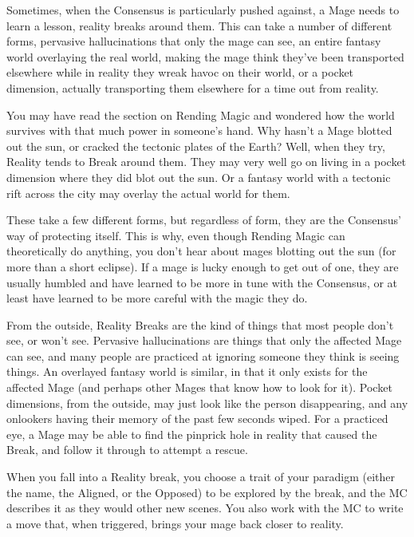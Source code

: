 \documentclass[
  oneside,
  statementpaper,
  9pt]{memoir}
\begin{document}
\begin{Player}

Sometimes, when the Consensus is particularly pushed against, a Mage needs to learn a lesson, reality breaks around them. This can take a number of different forms, pervasive hallucinations that only the mage can see, an entire fantasy world overlaying the real world, making the mage think they’ve been transported elsewhere while in reality they wreak havoc on their world, or a pocket dimension, actually transporting them elsewhere for a time out from reality.

You may have read the section on Rending Magic and wondered how the world survives with that much power in someone’s hand. Why hasn’t a Mage blotted out the sun, or cracked the tectonic plates of the Earth? Well, when they try, Reality tends to Break around them. They may very well go on living in a pocket dimension where they did blot out the sun. Or a fantasy world with a tectonic rift across the city may overlay the actual world for them.

These take a few different forms, but regardless of form, they are the Consensus’ way of protecting itself. This is why, even though Rending Magic can theoretically do anything, you don’t hear about mages blotting out the sun (for more than a short eclipse). If a mage is lucky enough to get out of one, they are usually humbled and have learned to be more in tune with the Consensus, or at least have learned to be more careful with the magic they do.

From the outside, Reality Breaks are the kind of things that most people don’t see, or won’t see. Pervasive hallucinations are things that only the affected Mage can see, and many people are practiced at ignoring someone they think is seeing things. An overlayed fantasy world is similar, in that it only exists for the affected Mage (and perhaps other Mages that know how to look for it). Pocket dimensions, from the outside, may just look like the person disappearing, and any onlookers having their memory of the past few seconds wiped. For a practiced eye, a Mage may be able to find the pinprick hole in reality that caused the Break, and follow it through to attempt a rescue.

When you fall into a Reality break, you choose a trait of your paradigm (either the name, the Aligned, or the Opposed) to be explored by the break, and the MC describes it as they would other new scenes. You also work with the MC to write a move that, when triggered, brings your mage back closer to reality.

\end{Player}
\end{document}
